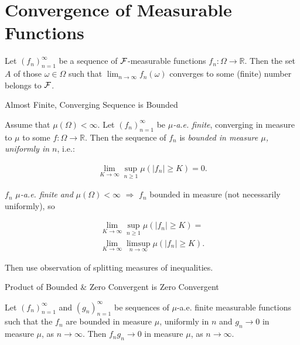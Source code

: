 
\section{Convergence of Measurable Functions}

\begin{exercise}{5.1}{}

    Let $(f_n)_{n=1}^{\infty}$ be a sequence of $\mathcal{F}$-measurable functions $f_n: \Omega \to \mathbb{R}$. Then the set $A$ of those $\omega \in \Omega$ such that $\lim_{n \to \infty} f_n(\omega)$ converges to some (finite) number belongs to $\mathcal{F}$.

\end{exercise}

\begin{exercise}{5.2}{Almost Finite, Converging Sequence is Bounded}

    Assume that $\mu(\Omega) < \infty$. Let $(f_n)_{n=1}^{\infty}$ be \emph{$\mu$-a.e. finite}, converging in measure to $\mu$ to some $f: \Omega \to \mathbb{R}$. Then the sequence of $f_n$ is \emph{bounded in measure $\mu$, uniformly in $n$}, i.e.:

        \begin{align*}
            \lim_{K \to \infty} \sup_{n \geq 1} \mu(|f_n| \geq K) = 0.
        \end{align*}

    \Hint $f_n$ \emph{$\mu$-a.e. finite} \emph{and} $\mu(\Omega) < \infty$ $\Rightarrow$ $f_n$ bounded in measure (not necessarily uniformly), so

        \begin{align*}
            \lim_{K \to \infty} \sup_{n \geq 1} \mu(|f_n| \geq K) = \\ \lim_{K \to \infty} \limsup_{n \to \infty} \mu(|f_n| \geq K).
        \end{align*}

    Then use observation of splitting measures of inequalities.

\end{exercise}

\begin{exercise}{5.3}{Product of Bounded \& Zero Convergent is Zero Convergent}

    Let $(f_n)_{n=1}^{\infty}$ and $(g_n)_{n=1}^{\infty}$ be sequences of $\mu$-a.e. finite measurable functions such that the $f_n$ are bounded in measure $\mu$, uniformly in $n$ and $g_n \to 0$ in measure $\mu$, as $n \to \infty$. Then $f_ng_n \to 0$ in measure $\mu$, as $n \to \infty$.

\end{exercise}

